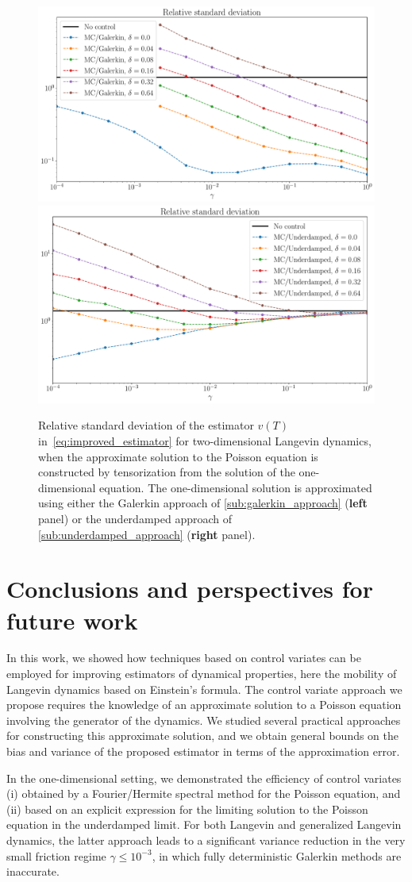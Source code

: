 \documentclass[11pt,a4paper]{article}
\begin{document}
\begin{figure}[ht]
    \centering
    \includegraphics[width=0.49\linewidth]{figures/var-delta-galerkin.pdf}
    \includegraphics[width=0.49\linewidth]{figures/var-delta-underdamped.pdf}
    \caption{
        Relative standard deviation of the estimator $v(T)$ in~\eqref{eq:improved_estimator} for two-dimensional Langevin dynamics,
        when the approximate solution to the Poisson equation is constructed by tensorization from the solution of the one-dimensional equation.
        The one-dimensional solution is approximated using either the Galerkin approach of \cref{sub:galerkin_approach} (\textbf{left} panel)
        or the underdamped approach of \cref{sub:underdamped_approach} (\textbf{right} panel).
    }%
    \label{fig:time_bias_deviation_2d}
\end{figure}

\section{Conclusions and perspectives for future work}%
\label{sec:conclusions_and_perspectives_for_future_work}
In this work,
we showed how techniques based on control variates can be employed for improving estimators of dynamical properties,
here the mobility of Langevin dynamics based on Einstein's formula.
The control variate approach we propose requires the knowledge of an approximate solution to a Poisson equation involving the generator of the dynamics.
We studied several practical approaches for constructing this approximate solution,
and we obtain general bounds on the bias and variance of the proposed estimator in terms of the approximation error.

In the one-dimensional setting,
we demonstrated the efficiency of control variates
(i) obtained by a Fourier/Hermite spectral method for the Poisson equation, and
(ii) based on an explicit expression for the limiting solution to the Poisson equation in the underdamped limit.
For both Langevin and generalized Langevin dynamics,
the latter approach leads to a significant variance reduction in the very small friction regime $\gamma \leq 10^{-3}$,
in which fully deterministic Galerkin methods are inaccurate.
\end{document}
